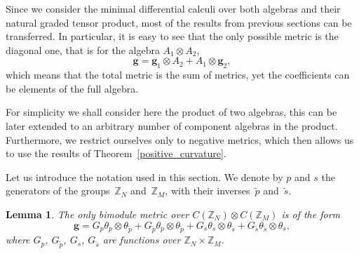 \documentclass[10pt,a4paper]{amsart}
\numberwithin{equation}{section}
\newtheorem{Lemma}[Theorem]{Lemma}
\newcommand{\Z}{\mathbb{Z}}
\newcommand{\ip}{{\tilde{p}}}
\newcommand{\is}{{\tilde{s}}}
\begin{document}
Since we consider the minimal differential calculi over both algebras and their
natural graded tensor product, most of the results from previous sections can
be transferred. In particular, it is easy to see that the only possible metric is the
diagonal one, that is for the algebra $A_1 \otimes A_2$,
\[ \mathbf{g} = \mathbf{g}_1 \otimes A_2 + A_1 \otimes \mathbf{g}_2, \]
which means that the total metric is the sum of metrics, yet the coefficients can
be elements of the full algebra.

For simplicity we shall consider here the product of two algebras, this can
be later extended to an arbitrary number of component algebras in the product.
Furthermore, we restrict ourselves only to negative metrics, which then allows
us to use the results of Theorem~\ref{positive_curvature}.

Let us introduce the notation used in this section. We denote by $p$ and $s$ the
generators of the groups~$\Z_N$ and~$\Z_M$, with their inverses~$\ip$ and~$\is$.

\begin{Lemma}The only bimodule metric over $C(\Z_N) \otimes C(\Z_M)$ is of the form
\begin{equation*}%
\mathbf{g} = G_p \theta_p \otimes \theta_\ip
+ G_\ip \theta_p \otimes \theta_\ip
+ G_s \theta_s \otimes \theta_\is
+ G_\is \theta_\is \otimes \theta_s,
\end{equation*}
where $G_p$, $G_\ip$, $G_s$, $G_\is$ are functions over $\Z_N \times \Z_M$.
\end{Lemma}
\end{document}
